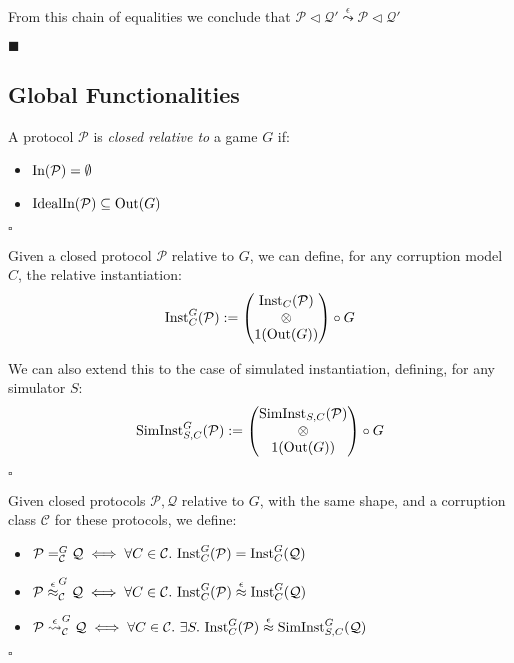 \begin{theorem}
  From this chain of equalities we conclude that
  $\mathcal{P} \lhd \mathcal{Q}' \overset{\epsilon}{\leadsto} \mathcal{P} \lhd \mathcal{Q}'$

  $\blacksquare$
\end{theorem}

\subsection{Global Functionalities}

\begin{definition}
  A protocol $\mathcal{P}$ is \emph{closed relative to} a game $G$
  if:
  \begin{itemize}
    \item $\text{In}(\mathcal{P}) = \emptyset$
    \item $\text{IdealIn}(\mathcal{P}) \subseteq \text{Out}(G)$
  \end{itemize} 

  $\square$
\end{definition}
\begin{definition}
  Given a closed protocol $\mathcal{P}$ relative to $G$, we can define,
  for any corruption model $C$,
  the relative instantiation:
  $$
  \text{Inst}_{C}^G(\mathcal{P}) :=
  \begin{pmatrix}
    \text{Inst}_C(\mathcal{P})\cr
    \otimes\cr
    1(\text{Out}(G))
  \end{pmatrix}
  \circ G
  $$

  We can also extend this to the case of simulated instantiation,
  defining, for any simulator $S$:
  $$
  \text{SimInst}_{S, C}^G(\mathcal{P}) :=
  \begin{pmatrix}
    \text{SimInst}_{S, C}(\mathcal{P})\cr
    \otimes\cr
    1(\text{Out}(G))
  \end{pmatrix}
  \circ G
  $$

  $\square$
\end{definition}

\begin{definition}
  Given closed protocols $\mathcal{P}, \mathcal{Q}$ relative to $G$,
  with the same shape, and a corruption class $\mathcal{C}$
  for these protocols, we define:
  \begin{itemize}
    \item $\mathcal{P} =^G_{\mathcal{C}} \mathcal{Q} \iff \forall C \in \mathcal{C}.\ \text{Inst}^G_C(\mathcal{P}) = \text{Inst}^G_C(\mathcal{Q})$
    \item $\mathcal{P} \overset{\epsilon}{\approx}^G_{\mathcal{C}} \mathcal{Q}\iff \forall C \in \mathcal{C}.\ \text{Inst}^G_C(\mathcal{P}) \overset{\epsilon}{\approx} \text{Inst}^G_C(\mathcal{Q})$
    \item $\mathcal{P} \overset{\epsilon}{\leadsto}^G_{\mathcal{C}} \mathcal{Q}\iff \forall C \in \mathcal{C}.\ \exists S.\ \text{Inst}^G_C(\mathcal{P}) \overset{\epsilon}{\approx} \text{SimInst}^G_{S,C}(\mathcal{Q})$
  \end{itemize}

  $\square$
\end{definition}

